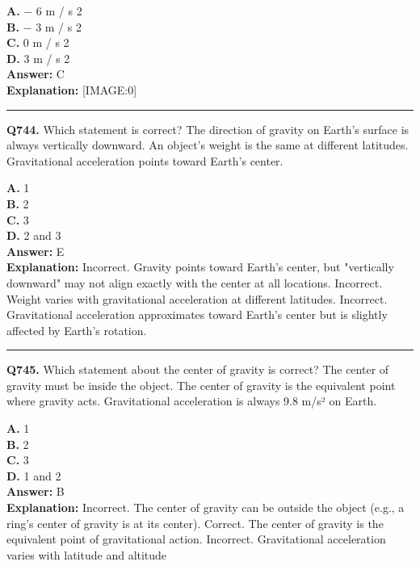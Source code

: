 \documentclass[12pt]{article}
\begin{document}
\textbf{A.} −
6
m
/
s
2 \\
\textbf{B.} −
3
m
/
s
2 \\
\textbf{C.} 0
m
/
s
2 \\
\textbf{D.} 3
m
/
s
2 \\

\textbf{Answer:} C \\
\textbf{Explanation:} [IMAGE:0]

\hrule
\vspace{1em}


\noindent
\textbf{Q744.} Which statement is correct?
The direction of gravity on Earth’s surface is always vertically downward.
An object’s weight is the same at different latitudes.
Gravitational acceleration points toward Earth’s center.



\textbf{A.} 1 \\
\textbf{B.} 2 \\
\textbf{C.} 3 \\
\textbf{D.} 2 and 3 \\

\textbf{Answer:} E \\
\textbf{Explanation:} Incorrect. Gravity points toward Earth’s center, but "vertically downward" may not align exactly with the center at all locations.
Incorrect. Weight varies with gravitational acceleration at different latitudes.
Incorrect. Gravitational acceleration approximates toward Earth’s center but is slightly affected by Earth’s rotation.

\hrule
\vspace{1em}


\noindent
\textbf{Q745.} Which statement about the center of gravity is correct?
The center of gravity must be inside the object.
The center of gravity is the equivalent point where gravity acts.
Gravitational acceleration is always 9.8 m/s² on Earth.



\textbf{A.} 1 \\
\textbf{B.} 2 \\
\textbf{C.} 3 \\
\textbf{D.} 1 and 2 \\

\textbf{Answer:} B \\
\textbf{Explanation:} Incorrect. The center of gravity can be outside the object (e.g., a ring’s center of gravity is at its center).
Correct. The center of gravity is the equivalent point of gravitational action.
Incorrect. Gravitational acceleration varies with latitude and altitude
\end{document}
